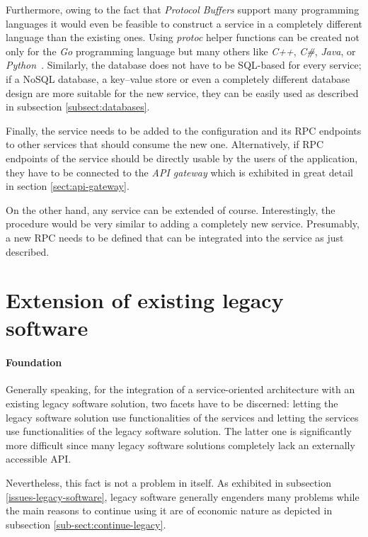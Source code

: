 \documentclass[12pt,a4paper,twoside]{report}
\begin{document}
Furthermore, owing to the fact that \textit{Protocol Buffers} support many
programming languages it would even be feasible to construct a service in a
completely different language than the existing ones.
Using \textit{protoc} helper functions can be created not only for the
\textit{Go} programming language but many others like \textit{C++}, \textit{C\#},
\textit{Java}, or \textit{Python}~\cite{protobuf}.
Similarly, the database does not have to be SQL-based for every service;
if a NoSQL database, a key–value store or even a completely different
database design are more suitable for the new service, they can be easily
used as described in subsection \ref{subsect:databases}.

Finally, the service needs to be added to the configuration and its RPC endpoints
to other services that should consume the new one.
Alternatively, if RPC endpoints of the service should be directly usable
by the users of the application, they have to be connected to the
\textit{API gateway} which is exhibited in great detail in section \ref{sect:api-gateway}.

On the other hand, any service can be extended of course.
Interestingly, the procedure would be very similar to adding a completely new service.
Presumably, a new RPC needs to be defined that can be integrated into the service
as just described.


\section{Extension of existing legacy software}

\paragraph{Foundation}
Generally speaking, for the integration of a service-oriented architecture with
an existing legacy software solution, two facets have to be discerned:
letting the legacy software solution use functionalities of the services and
letting the services use functionalities of the legacy software solution.
The latter one is significantly more difficult since many legacy software solutions
completely lack an externally accessible API.

Nevertheless, this fact is not a problem in itself.
As exhibited in subsection \ref{issues-legacy-software}, legacy software generally
engenders many problems while the main reasons to continue using it are of
economic nature as depicted in subsection \ref{sub-sect:continue-legacy}.
\end{document}
